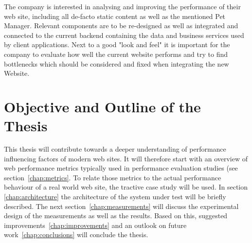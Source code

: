The company is interested in analysing and improving the performance of their web site, including all de-facto static content as well as the mentioned Pet Manager. Relevant components are to be re-designed as well as integrated and connected to the current backend containing the data and business services used by client applications. Next to a good "look and feel" it is important for the company to evaluate how well the current website performs and try to find bottlenecks which should be considered and fixed when integrating the new Website.     

\section{Objective and Outline of the Thesis}

This thesis will contribute towards a deeper understanding of performance influencing factors of modern web sites.
It will therefore start with an overview of web performance metrics typically used in performance evaluation studies (see section~\ref{chap:metrics}.
To relate those metrics to the actual performance behaviour of a real world web site, the tractive case study will be used. 
In section \ref{chap:architecture} the architecture of the system under test will be briefly described.
The next section~\ref{chap:measurements} will discuss the  experimental design of the measurements as well as the results.
Based on this, suggested improvements~\ref{chap:improvements}  and an outlook on future work~\ref{chap:conclusions} will conclude the thesis.
